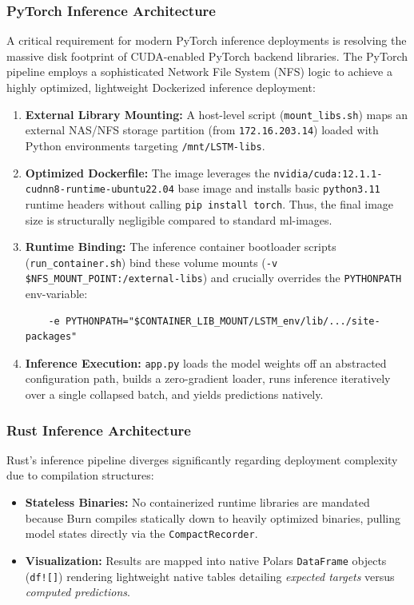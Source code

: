 \documentclass{ieeeaccess}
\begin{document}
\subsubsection{PyTorch Inference Architecture}
A critical requirement for modern PyTorch inference deployments is resolving the massive disk footprint of CUDA-enabled PyTorch backend libraries. The PyTorch pipeline employs a sophisticated Network File System (NFS) logic to achieve a highly optimized, lightweight Dockerized inference deployment:
\begin{enumerate}
    \item \textbf{External Library Mounting:} A host-level script (\texttt{mount\_libs.sh}) maps an external NAS/NFS storage partition (from \texttt{172.16.203.14}) loaded with Python environments targeting \texttt{/mnt/LSTM-libs}.
    \item \textbf{Optimized Dockerfile:} The image leverages the \texttt{nvidia/cuda:12.1.1-cudnn8-runtime-ubuntu22.04} base image and installs basic \texttt{python3.11} runtime headers without calling \texttt{pip install torch}. Thus, the final image size is structurally negligible compared to standard ml-images.
    \item \textbf{Runtime Binding:} The inference container bootloader scripts (\texttt{run\_container.sh}) bind these volume mounts (\texttt{-v \$NFS\_MOUNT\_POINT:/external-libs}) and crucially overrides the \texttt{PYTHONPATH} env-variable:
    \begin{lstlisting}
    -e PYTHONPATH="$CONTAINER_LIB_MOUNT/LSTM_env/lib/.../site-packages"
    \end{lstlisting}
    \item \textbf{Inference Execution:} \texttt{app.py} loads the model weights off an abstracted configuration path, builds a zero-gradient loader, runs inference iteratively over a single collapsed batch, and yields predictions natively. 
\end{enumerate}

\subsubsection{Rust Inference Architecture}
Rust's inference pipeline diverges significantly regarding deployment complexity due to compilation structures:
\begin{itemize}
    \item \textbf{Stateless Binaries:} No containerized runtime libraries are mandated because Burn compiles statically down to heavily optimized binaries, pulling model states directly via the \texttt{CompactRecorder}.
    \item \textbf{Visualization:} Results are mapped into native Polars \texttt{DataFrame} objects (\texttt{df![]}) rendering lightweight native tables detailing \textit{expected targets} versus \textit{computed predictions}.
\end{itemize}
\end{document}
